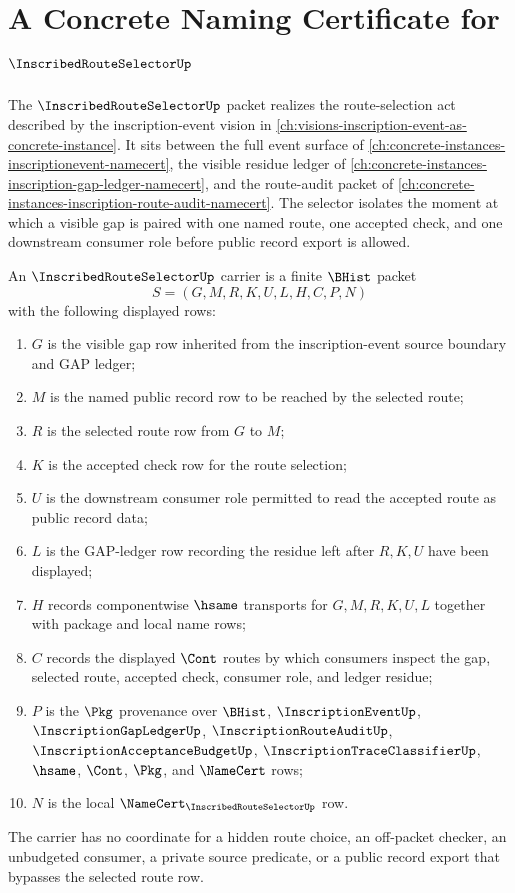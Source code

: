 \chapter{A Concrete Naming Certificate for $\InscribedRouteSelectorUp$}
\label{ch:concrete-instances-inscribedrouteselector-namecert}

The $\InscribedRouteSelectorUp$ packet realizes the route-selection act described by the inscription-event vision in \autoref{ch:visions-inscription-event-as-concrete-instance}. It sits between the full event surface of \autoref{ch:concrete-instances-inscriptionevent-namecert}, the visible residue ledger of \autoref{ch:concrete-instances-inscription-gap-ledger-namecert}, and the route-audit packet of \autoref{ch:concrete-instances-inscription-route-audit-namecert}. The selector isolates the moment at which a visible gap is paired with one named route, one accepted check, and one downstream consumer role before public record export is allowed.

\begin{definition}
\label{def:inscribed-route-selector-carrier}
An $\InscribedRouteSelectorUp$ carrier is a finite $\BHist$ packet
$$
S=(G,M,R,K,U,L,H,C,P,N)
$$
with the following displayed rows:
\begin{enumerate}
\item $G$ is the visible gap row inherited from the inscription-event source boundary and GAP ledger;
\item $M$ is the named public record row to be reached by the selected route;
\item $R$ is the selected route row from $G$ to $M$;
\item $K$ is the accepted check row for the route selection;
\item $U$ is the downstream consumer role permitted to read the accepted route as public record data;
\item $L$ is the GAP-ledger row recording the residue left after $R,K,U$ have been displayed;
\item $H$ records componentwise $\hsame$ transports for $G,M,R,K,U,L$ together with package and local name rows;
\item $C$ records the displayed $\Cont$ routes by which consumers inspect the gap, selected route, accepted check, consumer role, and ledger residue;
\item $P$ is the $\Pkg$ provenance over $\BHist$, $\InscriptionEventUp$, $\InscriptionGapLedgerUp$, $\InscriptionRouteAuditUp$, $\InscriptionAcceptanceBudgetUp$, $\InscriptionTraceClassifierUp$, $\hsame$, $\Cont$, $\Pkg$, and $\NameCert$ rows;
\item $N$ is the local $\NameCert_{\InscribedRouteSelectorUp}$ row.
\end{enumerate}
The carrier has no coordinate for a hidden route choice, an off-packet checker, an unbudgeted consumer, a private source predicate, or a public record export that bypasses the selected route row.
\end{definition}


